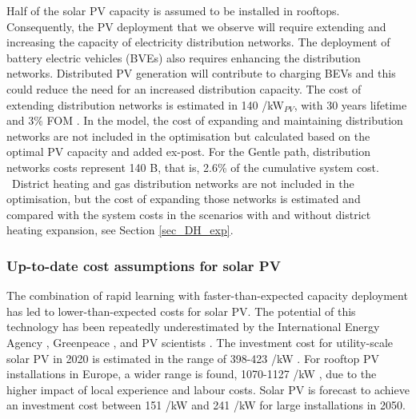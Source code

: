\documentclass[3p]{elsarticle} %
\begin{document}
Half of the solar PV capacity is assumed to be installed in rooftops. Consequently, the PV deployment that we observe will require extending and increasing the capacity of electricity distribution networks. The deployment of battery electric vehicles (BVEs) also requires enhancing the distribution networks. Distributed PV generation will contribute to charging BEVs and this could reduce the need for an increased distribution capacity. The cost of extending distribution networks is estimated in 140 \EUR/kW$_{PV}$, with 30 years lifetime and 3\% FOM \cite{Sterchele_2020, DEA_2019}. In the model, the cost of expanding and maintaining distribution networks are not included in the optimisation but calculated based on the optimal PV capacity and added ex-post. For the Gentle path, distribution networks costs represent 140 B\EUR, that is, 2.6\% of the cumulative system cost.  \
District heating and gas distribution networks are not included in the optimisation, but the cost of expanding those networks is estimated and compared with the system costs in the scenarios with and without district heating expansion, see Section \ref{sec_DH_exp}. 

\subsubsection{Up-to-date cost assumptions for solar PV} 

The combination of rapid learning with faster-than-expected capacity deployment has led to lower-than-expected costs for solar PV. The potential of this technology has been repeatedly underestimated by the International Energy Agency \cite{Fell_2015}, Greenpeace \cite{Creutzig_2017}, and PV scientists \cite{Haegel_2019}. The investment cost for utility-scale solar PV in 2020 is estimated in the range of 398-423 \EUR/kW \cite{Vartiainen_2017, DEA_2019}. For rooftop PV installations in Europe, a wider range is found, 1070-1127 \EUR/kW \cite{DEA_2019, Fraunhofer, Vartiainen_2017}, due to the higher impact of local experience and labour costs. Solar PV is forecast to achieve an investment cost between 151 \EUR/kW \cite{Vartiainen_2019} and 241 \EUR/kW  \cite{DEA_2019} for large installations in 2050. \\
\end{document}
